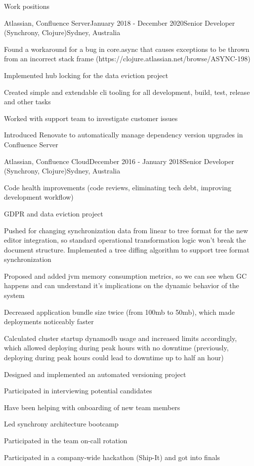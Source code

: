 \documentclass{resume} %
\begin{document}
\begin{rSection}{Work positions}
\begin{rSubsection}{Atlassian, Confluence Server}{January 2018 - December 2020}{Senior Developer (Synchrony, Clojure)}{Sydney, Australia}
\item Found a workaround for a bug in core.async that causes exceptions to be thrown from an incorrect stack frame (https://clojure.atlassian.net/browse/ASYNC-198)
\item Implemented hub locking for the data eviction project
\item Created simple and extendable cli tooling for all development, build, test, release and other tasks
\item Worked with support team to investigate customer issues
\item Introduced Renovate to automatically manage dependency version upgrades in Confluence Server
~
\end{rSubsection}

\begin{rSubsection}{Atlassian, Confluence Cloud}{December 2016 - January 2018}{Senior Developer (Synchrony, Clojure)}{Sydney, Australia}

\item Code health improvements (code reviews, eliminating tech debt, improving development workflow)
\item GDPR and data eviction project
\item Pushed for changing synchronization data from linear to tree format for the new editor integration, so standard operational transformation logic won't break the document structure. Implemented a tree diffing algorithm to support tree format synchronization
\item Proposed and added jvm memory consumption metrics, so we can see when GC happens and can understand it's implications on the dynamic behavior of the system
\item Decreased application bundle size twice (from 100mb to 50mb), which made deployments noticeably faster
\item Calculated cluster startup dynamodb usage and increased limits accordingly, which allowed deploying during peak hours with no downtime (previously, deploying during peak hours could lead to downtime up to half an hour)
\item Designed and implemented an automated versioning project
\item Participated in interviewing potential candidates
\item Have been helping with onboarding of new team members
\item Led synchrony architecture bootcamp
\item Participated in the team on-call rotation
\item Participated in a company-wide hackathon (Ship-It) and got into finals
~
\end{rSubsection}


\end{rSection}
\end{document}
